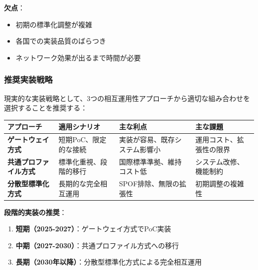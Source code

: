 \documentclass[
  a4paper,
  a4paper,
  11pt]{ltjsbook}
\providecommand{\tightlist}{%
  \setlength{\itemsep}{0pt}\setlength{\parskip}{0pt}}
\begin{document}
\textbf{欠点}：

\begin{itemize}
\tightlist
\item
  初期の標準化調整が複雑
\item
  各国での実装品質のばらつき
\item
  ネットワーク効果が出るまで時間が必要
\end{itemize}

\subsubsection{推奨実装戦略}\label{ux63a8ux5968ux5b9fux88c5ux6226ux7565}

現実的な実装戦略として、3つの相互運用性アプローチから適切な組み合わせを選択することを推奨する：

\begin{longtable}[]{@{}
  >{\raggedright\arraybackslash}p{}
  >{\raggedright\arraybackslash}p{}
  >{\raggedright\arraybackslash}p{}
  >{\raggedright\arraybackslash}p{}@{}}
\toprule\noalign{}
\begin{minipage}[b]{\linewidth}\raggedright
アプローチ
\end{minipage} & \begin{minipage}[b]{\linewidth}\raggedright
適用シナリオ
\end{minipage} & \begin{minipage}[b]{\linewidth}\raggedright
主な利点
\end{minipage} & \begin{minipage}[b]{\linewidth}\raggedright
主な課題
\end{minipage} \\
\midrule\noalign{}
\endhead
\bottomrule\noalign{}
\endlastfoot
\textbf{ゲートウェイ方式} & 短期PoC、限定的な接続 &
実装が容易、既存システム影響小 & 運用コスト、拡張性の限界 \\
\textbf{共通プロファイル方式} & 標準化重視、段階的移行 &
国際標準準拠、維持コスト低 & システム改修、機能制約 \\
\textbf{分散型標準化方式} & 長期的な完全相互運用 &
SPOF排除、無限の拡張性 & 初期調整の複雑性 \\
\end{longtable}

\textbf{段階的実装の推奨}：

\begin{enumerate}
\def\labelenumi{\arabic{enumi}.}
\tightlist
\item
  \textbf{短期（2025-2027）}：ゲートウェイ方式でPoC実装
\item
  \textbf{中期（2027-2030）}：共通プロファイル方式への移行
\item
  \textbf{長期（2030年以降）}：分散型標準化方式による完全相互運用
\end{enumerate}
\end{document}
